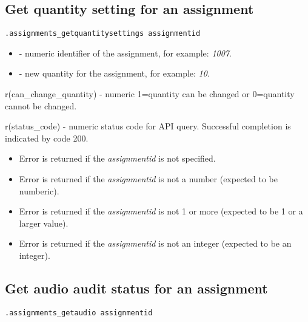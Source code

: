 \subsection{Get quantity setting for an assignment}

\begin{lstlisting}[style=CommandLineStyle]
.assignments_getquantitysettings assignmentid
\end{lstlisting}

\paramsheader
\begin{itemize}
    \item {} - numeric identifier of the assignment, for example: \textit{1007}.
    \item {} - new quantity for the assignment, for example: \textit{10}.
\end{itemize}

\savedres
\begin{compactitem}
    \item r(can\_change\_quantity) - numeric 1=quantity can be changed or 0=quantity cannot be changed.
    \item r(status\_code)  - numeric status code for API query. Successful completion is indicated by code 200.
\end{compactitem}

\errheader
\begin{itemize}
    \item Error  is returned if the \textit{assignmentid} is not specified.
    \item Error  is returned if the \textit{assignmentid} is not a number (expected to be numberic).
    \item Error  is returned if the \textit{assignmentid} is not 1 or more (expected to be 1 or a larger value).
    \item Error  is returned if the \textit{assignmentid} is not an integer (expected to be an integer).
\end{itemize}


\subsection{Get audio audit status for an assignment}

\begin{lstlisting}[style=CommandLineStyle]
.assignments_getaudio assignmentid
\end{lstlisting}

